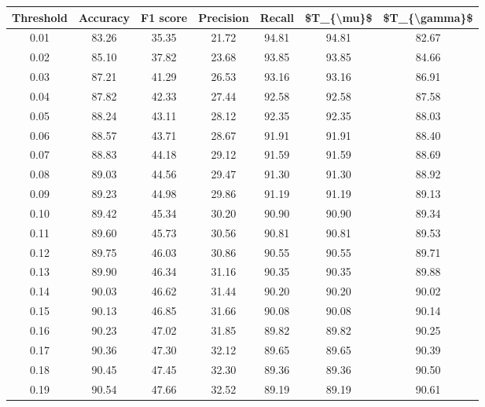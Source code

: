\begin{tabular}{|c|c|c|c|c|c|c|}
\hline
 Threshold &  Accuracy &  F1 score &  Precision &  Recall &  \$T\_\{\textbackslash mu\}\$ &  \$T\_\{\textbackslash gamma\}\$ \\
\hline
      0.01 &     83.26 &     35.35 &      21.72 &   94.81 &      94.81 &         82.67 \\
      0.02 &     85.10 &     37.82 &      23.68 &   93.85 &      93.85 &         84.66 \\
      0.03 &     87.21 &     41.29 &      26.53 &   93.16 &      93.16 &         86.91 \\
      0.04 &     87.82 &     42.33 &      27.44 &   92.58 &      92.58 &         87.58 \\
      0.05 &     88.24 &     43.11 &      28.12 &   92.35 &      92.35 &         88.03 \\
      0.06 &     88.57 &     43.71 &      28.67 &   91.91 &      91.91 &         88.40 \\
      0.07 &     88.83 &     44.18 &      29.12 &   91.59 &      91.59 &         88.69 \\
      0.08 &     89.03 &     44.56 &      29.47 &   91.30 &      91.30 &         88.92 \\
      0.09 &     89.23 &     44.98 &      29.86 &   91.19 &      91.19 &         89.13 \\
      0.10 &     89.42 &     45.34 &      30.20 &   90.90 &      90.90 &         89.34 \\
      0.11 &     89.60 &     45.73 &      30.56 &   90.81 &      90.81 &         89.53 \\
      0.12 &     89.75 &     46.03 &      30.86 &   90.55 &      90.55 &         89.71 \\
      0.13 &     89.90 &     46.34 &      31.16 &   90.35 &      90.35 &         89.88 \\
      0.14 &     90.03 &     46.62 &      31.44 &   90.20 &      90.20 &         90.02 \\
      0.15 &     90.13 &     46.85 &      31.66 &   90.08 &      90.08 &         90.14 \\
      0.16 &     90.23 &     47.02 &      31.85 &   89.82 &      89.82 &         90.25 \\
      0.17 &     90.36 &     47.30 &      32.12 &   89.65 &      89.65 &         90.39 \\
      0.18 &     90.45 &     47.45 &      32.30 &   89.36 &      89.36 &         90.50 \\
      0.19 &     90.54 &     47.66 &      32.52 &   89.19 &      89.19 &         90.61 \\

\end{tabular}
